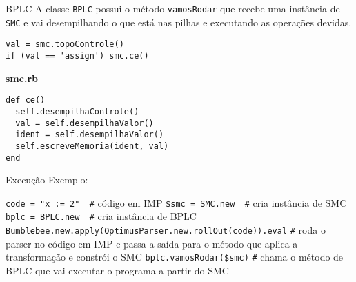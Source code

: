 \documentclass{beamer}
\begin{document}
\begin{frame}[fragile]{BPLC}
A classe \verb|BPLC| possui o método \verb|vamosRodar| que recebe uma instância de \verb|SMC| e vai desempilhando o que está nas pilhas e executando as operações devidas.

\begin{verbatim}
val = smc.topoControle()
if (val == 'assign') smc.ce()
\end{verbatim}

\textbf{smc.rb}
\begin{verbatim}
def ce()
  self.desempilhaControle()
  val = self.desempilhaValor()
  ident = self.desempilhaValor()
  self.escreveMemoria(ident, val)
end
\end{verbatim}

\end{frame}


\begin{frame}[fragile]{Execução}
Exemplo:

\verb|code = "x := 2"  #| código em IMP\newline\newline
\verb|$smc = SMC.new  #| cria instância de SMC\newline\newline
\verb|bplc = BPLC.new  #| cria instância de BPLC\newline\newline
\verb|Bumblebee.new.apply(OptimusParser.new.rollOut(code)).eval|\newline
\verb|#| roda o parser no código em IMP e passa a saída para o método que aplica a transformação e constrói o SMC\newline\newline
\verb|bplc.vamosRodar($smc)|\newline
\verb|#| chama o método de BPLC que vai executar o programa a partir do SMC

\end{frame}
\end{document}
